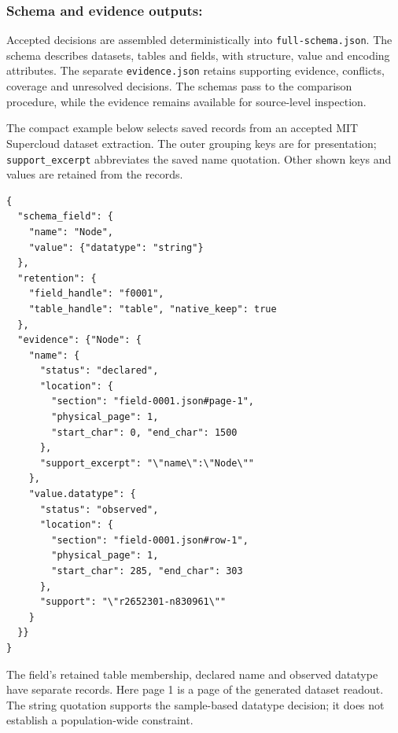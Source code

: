 \subsubsection{Schema and evidence outputs:}
Accepted decisions are assembled deterministically into
\texttt{full-schema.json}. The schema describes datasets, tables and fields,
with structure, value and encoding attributes.
The separate \texttt{evidence.json} retains supporting evidence, conflicts,
coverage and unresolved decisions. The schemas pass to the comparison
procedure, while the evidence remains available for source-level inspection.

\par\smallskip\noindent
\begin{minipage}{\columnwidth}
\setlength{\parindent}{1em}
The compact example below selects saved records from an accepted MIT
Supercloud dataset extraction. The outer grouping keys are for presentation;
\texttt{support\_excerpt} abbreviates the saved name quotation. Other shown
keys and values are retained from the records.

\begingroup
\footnotesize
\begin{verbatim}
{
  "schema_field": {
    "name": "Node",
    "value": {"datatype": "string"}
  },
  "retention": {
    "field_handle": "f0001",
    "table_handle": "table", "native_keep": true
  },
  "evidence": {"Node": {
    "name": {
      "status": "declared",
      "location": {
        "section": "field-0001.json#page-1",
        "physical_page": 1,
        "start_char": 0, "end_char": 1500
      },
      "support_excerpt": "\"name\":\"Node\""
    },
    "value.datatype": {
      "status": "observed",
      "location": {
        "section": "field-0001.json#row-1",
        "physical_page": 1,
        "start_char": 285, "end_char": 303
      },
      "support": "\"r2652301-n830961\""
    }
  }}
}
\end{verbatim}
\endgroup

The field's retained table membership, declared name and observed datatype
have separate records. Here page 1 is a page of the generated dataset
readout. The string quotation supports the sample-based datatype decision;
it does not establish a population-wide constraint.
\end{minipage}
